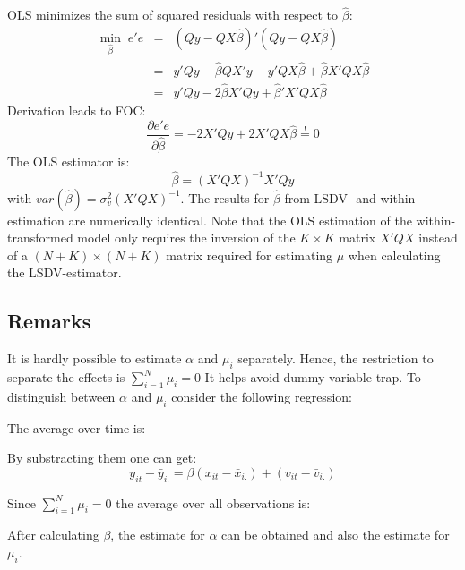 \documentclass[11pt, a4paper, leqno]{article}
\begin{document}
OLS minimizes the sum of squared residuals with respect to $\widehat{\beta}$:
\begin{eqnarray}
    \min_{\widehat{\beta}}\;e'e&=&(Qy-QX\widehat{\beta})'(Qy-QX\widehat{\beta})\nonumber\\&=&y'Qy-\widehat{\beta}QX'y-y'QX\widehat{\beta}+\widehat{\beta}X'QX\widehat{\beta}\nonumber\\&=&y'Qy-2\widehat{\beta}X'Qy+\widehat{\beta}'X'QX\widehat{\beta}
\end{eqnarray}
Derivation leads to FOC:
\begin{equation}
    \frac{\partial e'e}{\partial \widehat{\beta}}=-2X'Qy+2X'QX\widehat{\beta}\overset{!}{=}0
\end{equation}
The OLS estimator is:
\begin{equation}
    \widehat{\beta}=(X'QX)^{-1}X'Qy
\end{equation}
with $var(\widehat{\beta})=\sigma_v^2(X'QX)^{-1}$.
The results for $\widehat{\beta}$ from LSDV- and within-estimation are numerically identical. Note that the OLS estimation of the within-transformed model only requires the inversion of the $K\times K$ matrix $X'QX$ instead of a $(N+K)\times(N+K)$ matrix required for estimating $\mu$ when calculating the LSDV-estimator.


\subsection{Remarks}
It is hardly possible to estimate $\alpha$ and $\mu_i$ separately. Hence, the restriction to separate the effects is $\sum_{i=1}^N \mu_i=0$
It helps avoid dummy variable trap. To distinguish between $\alpha$ and $\mu_i$ consider the following regression:


The average over time is:


By substracting them one can get:
\begin{equation}
    y_{it}-\bar{y}_{i.}=\beta (x_{it}-\bar{x}_{i.})+(v_{it}-\bar{v}_{i.})
\end{equation}

Since $\sum_{i=1}^N \mu_i=0$ the average over all observations is:



After calculating $\beta$, the estimate for $\alpha$ can be obtained and also the estimate for $\mu_i$.

\end{document}
